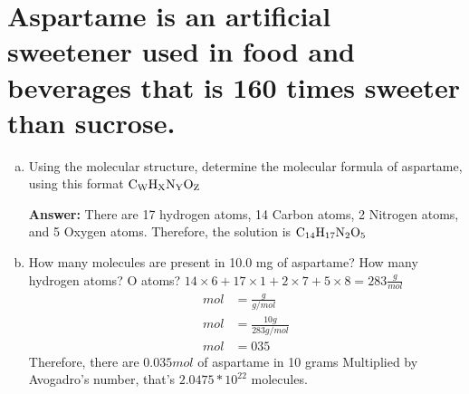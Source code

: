 \documentclass[11pt]{article}
\begin{document}
\section{Aspartame is an artificial sweetener used in food and beverages that is 160 times sweeter than sucrose.}
\label{sec:org9e502d7}
\begin{enumerate}[(a)]
\item Using the molecular structure, determine the molecular formula of aspartame,
using this format \(\ce{C_{W}H_{X}N_{Y}O_{Z}}\)

\textbf{Answer:} There are 17 hydrogen atoms, 14 Carbon atoms, 2 Nitrogen atoms, and 5 Oxygen atoms. Therefore, the solution is \(\ce{C14H17N2O5}\)
\item How many molecules are present in 10.0 mg of aspartame? How many hydrogen atoms? O atoms?
\(14\times6+17\times1+2\times7+5\times8=283\frac{g}{mol}\)
\begin{align*}
mol&=\frac{g}{g/mol}\\
mol&=\frac{10g}{283g/mol}\\
mol&=035
\end{align*}
Therefore, there are \(0.035mol\) of aspartame in 10 grams
Multiplied by Avogadro's number, that's \(2.0475*10^{22}\) molecules.
\end{enumerate}
\end{document}
